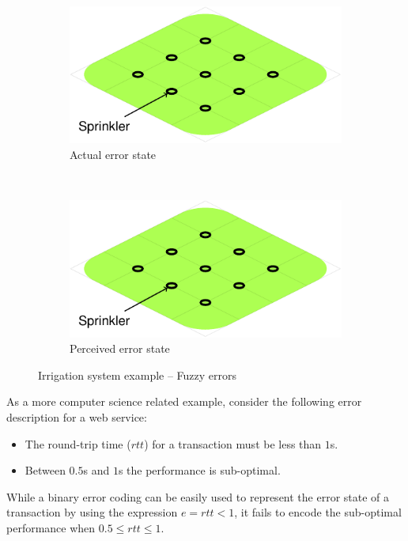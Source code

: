 \begin{figure}[!ht]
  \begin{subfigure}{\columnwidth}
    \includegraphics[page=11]{figures/introduction/figures/main.pdf}
    \caption{Actual error state\label{fig:intro:example-fuzzyerrors-continuous}}
  \end{subfigure}
  \\[2em]
  \begin{subfigure}{\columnwidth}
    \includegraphics[page=12]{figures/introduction/figures/main.pdf}
    \caption{Perceived error state\label{fig:intro:example-fuzzyerrors-discrete}}
  \end{subfigure}
  \caption{Irrigation system example -- Fuzzy errors}
\end{figure}


As a more computer science related example, consider the following
error description for a web service:
\begin{itemize}[nolistsep]
\item The round-trip time ($rtt$) for a transaction must be less than
  $1$s.
\item Between $0.5$s and $1$s the performance is sub-optimal.
\end{itemize}
%
While a binary error coding can be easily used to represent the error
state of a transaction by using the expression $e = rtt < 1$, it fails
to encode the sub-optimal performance when $0.5 \leq rtt \leq 1$.


